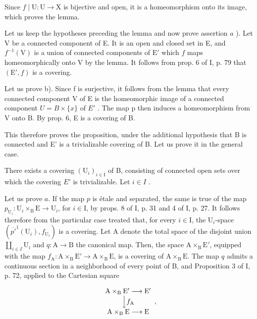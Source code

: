 Since \(f \mid \mathrm{U} \colon \mathrm{U} \to \mathrm{X}\) is bijective and open, it is a homeomorphism onto its image, which proves the lemma.

Let us keep the hypotheses preceding the lemma and now prove assertion \(a\) ). Let V be a connected component of E. It is an open and closed set in E, and \(f^{-1}(\mathrm{V})\) is a union of connected components of \(\mathrm{E}'\) which \(f\) maps homeomorphically onto V by the lemma. It follows from prop. 6 of I, p. 79 that \((\mathrm{E}', f)\) is a covering.

Let us prove b). Since f is surjective, it follows from the lemma that every connected component V of E is the homeomorphic image of a connected component \(U = B \times \{x\}\) of \(E'\) . The map p then induces a homeomorphism from V onto B. By prop. 6, E is a covering of B.

This therefore proves the proposition, under the additional hypothesis that B is connected and E' is a trivializable covering of B. Let us prove it in the general case.

There exists a covering \((\mathrm{U}_{i})_{i\in\mathrm{I}}\) of B, consisting of connected open sets over which the covering \(E'\) is trivializable. Let \(i\in I\) .

Let us prove \(a\). If the map \(p\) is étale and separated, the same is true of the map \(p_{\mathrm{U}_i}\colon \mathrm{U}_i\times_{\mathrm{B}}\mathrm{E}\to \mathrm{U}_i\), for \(i\in \mathrm{I}\), by props. 8 of I, p. 31 and 4 of I, p. 27. It follows therefore from the particular case treated that, for every \(i\in \mathrm{I}\), the \(\mathrm{U}_i\)-space \((\overline{p'}^{1}(\mathrm{U}_i),f_{\mathrm{U}_i})\) is a covering. Let A denote the total space of the disjoint union \(\coprod_{i\in I}\mathrm{U}_i\) and \(q\colon \mathrm{A}\to \mathrm{B}\) the canonical map. Then, the space \(\mathrm{A}\times_{\mathrm{B}}\mathrm{E}'\), equipped with the map \(f_{\mathrm{A}}\colon \mathrm{A}\times_{\mathrm{B}}\mathrm{E}'\to \mathrm{A}\times_{\mathrm{B}}\mathrm{E}\), is a covering of \(\mathrm{A}\times_{\mathrm{B}}\mathrm{E}\). The map \(q\) admits a continuous section in a neighborhood of every point of B, and Proposition 3 of I, p. 72, applied to the Cartesian square

\[
\begin{array}{c} \mathrm {A\times_ {B} E^ {\prime}} \longrightarrow \mathrm {E^ {\prime}} \\ \Big \downarrow f _ {\mathrm{A}} \\ \mathrm {A\times_ {B} E} \longrightarrow \mathrm{E} \end{array} ,
\]

